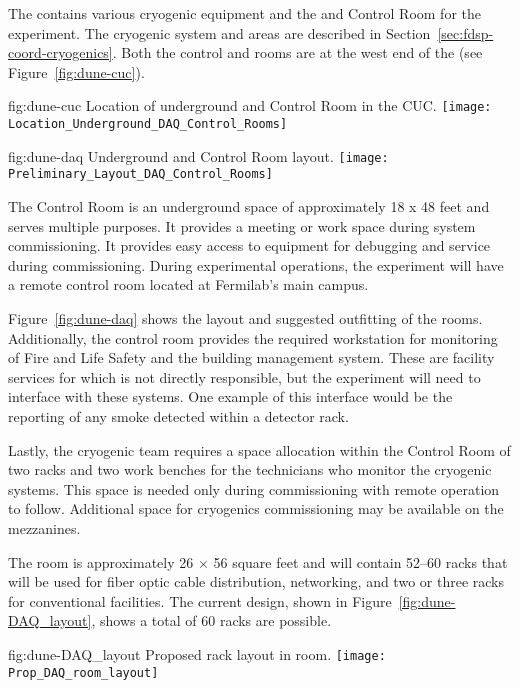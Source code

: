 The  contains various cryogenic equipment and the
 and Control Room for the  experiment.  The
cryogenic system and areas are described in
Section~\ref{sec:fdsp-coord-cryogenics}. Both the control and 
rooms are at the west end of the  (see
Figure~\ref{fig:dune-cuc}).
\begin{dunefigure}{fig:dune-cuc}
  {Location of underground  and Control Room in the CUC.}
  \texttt{[image: Location\_Underground\_DAQ\_Control\_Rooms]}
\end{dunefigure}
\begin{dunefigure}{fig:dune-daq}
  {Underground  and Control Room layout.}
  \texttt{[image: Preliminary\_Layout\_DAQ\_Control\_Rooms]}
\end{dunefigure}


The Control Room is an underground space of approximately 18 x 48 feet
and serves multiple purposes.  It provides a meeting or work space
during system commissioning. It provides easy access to 
equipment for debugging and service during commissioning.  During
experimental operations, the  experiment will have a remote
control room located at Fermilab's main campus.

Figure~\ref{fig:dune-daq} shows the layout and suggested outfitting of
the rooms. Additionally, the control room provides the required
workstation for monitoring of Fire and Life Safety and the building
management system.  These are facility services for which  is not
directly responsible, but the experiment will need to
interface with these systems.  One example of this interface would be
the reporting of any smoke detected within a detector rack.

Lastly, the cryogenic team requires a space allocation within the
Control Room of two racks and two work benches for the technicians who
monitor the cryogenic systems. This space is needed only during
commissioning with remote operation to follow. Additional space for
cryogenics commissioning may be available on the mezzanines.
       
The  room is approximately 26 $\times$ 56 square feet and will
contain 52--60 racks that will be used for fiber optic cable
distribution, networking,   and two or three
racks for conventional facilities.  The current design, shown in
Figure~\ref{fig:dune-DAQ_layout}, shows a total of 60 racks are
possible.
\begin{dunefigure}{fig:dune-DAQ_layout}
  {Proposed rack layout in  room.}
  \texttt{[image: Prop\_DAQ\_room\_layout]}
\end{dunefigure}
  

